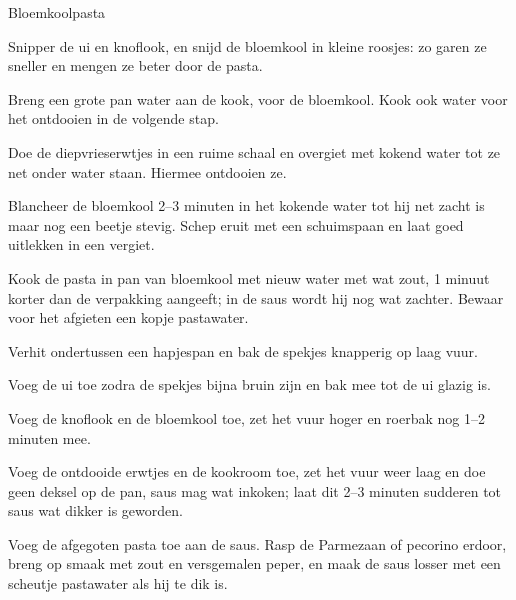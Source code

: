 \begin{recipe}{Bloemkoolpasta}
\begin{steps}
  \item Snipper de ui en knoflook, en snijd de bloemkool in kleine roosjes: zo
        garen ze sneller en mengen ze beter door de pasta.
  \item Breng een grote pan water aan de kook, voor de bloemkool. 
        Kook ook water voor het ontdooien in de volgende stap.
  \item Doe de diepvrieserwtjes in een ruime schaal en overgiet met kokend water tot
        ze net onder water staan. Hiermee ontdooien ze.
  \item Blancheer de bloemkool 2–3 minuten in het kokende water tot hij net
        zacht is maar nog een beetje stevig. Schep eruit
        met een schuimspaan en laat goed uitlekken in een vergiet.
  \item Kook de pasta in pan van bloemkool met nieuw water met wat zout,
        1 minuut korter dan de verpakking aangeeft; in de saus wordt hij 
        nog wat zachter. Bewaar voor het afgieten een kopje pastawater.
  \item Verhit ondertussen een hapjespan en bak de spekjes
        knapperig op laag vuur. 
  \item Voeg de ui toe zodra de spekjes bijna bruin zijn en bak
        mee tot de ui glazig is. 
  \item Voeg de knoflook en de bloemkool toe, zet het vuur hoger en
        roerbak nog 1–2 minuten mee.
  \item Voeg de ontdooide erwtjes en de kookroom toe, zet het vuur weer laag en
        doe geen deksel op de pan, saus mag wat inkoken; laat dit 2–3 minuten 
        sudderen tot saus wat dikker is geworden.
  \item Voeg de afgegoten pasta toe aan de saus. Rasp de Parmezaan of
        pecorino erdoor, breng op smaak met zout en versgemalen peper, en
        maak de saus losser met een scheutje pastawater als hij te dik is.
\end{steps}
\end{recipe}
